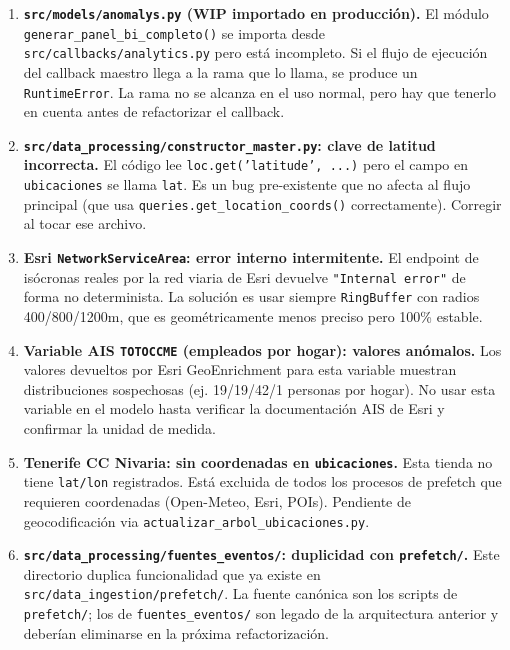 \documentclass[12pt, a4paper]{article}
\begin{document}
\begin{enumerate}
  \item \textbf{\texttt{src/models/anomalys.py} (WIP importado en producción).} El módulo \texttt{generar\_panel\_bi\_completo()} se importa desde \texttt{src/callbacks/analytics.py} pero está incompleto. Si el flujo de ejecución del callback maestro llega a la rama que lo llama, se produce un \texttt{RuntimeError}. La rama no se alcanza en el uso normal, pero hay que tenerlo en cuenta antes de refactorizar el callback.

  \item \textbf{\texttt{src/data\_processing/constructor\_master.py}: clave de latitud incorrecta.} El código lee \texttt{loc.get('latitude', ...)} pero el campo en \texttt{ubicaciones} se llama \texttt{lat}. Es un bug pre-existente que no afecta al flujo principal (que usa \texttt{queries.get\_location\_coords()} correctamente). Corregir al tocar ese archivo.

  \item \textbf{Esri \texttt{NetworkServiceArea}: error interno intermitente.} El endpoint de isócronas reales por la red viaria de Esri devuelve \texttt{"Internal error"} de forma no determinista. La solución es usar siempre \texttt{RingBuffer} con radios 400/800/1200m, que es geométricamente menos preciso pero 100\% estable.

  \item \textbf{Variable AIS \texttt{TOTOCCME} (empleados por hogar): valores anómalos.} Los valores devueltos por Esri GeoEnrichment para esta variable muestran distribuciones sospechosas (ej. 19/19/42/1 personas por hogar). No usar esta variable en el modelo hasta verificar la documentación AIS de Esri y confirmar la unidad de medida.

  \item \textbf{Tenerife CC Nivaria: sin coordenadas en \texttt{ubicaciones}.} Esta tienda no tiene \texttt{lat/lon} registrados. Está excluida de todos los procesos de prefetch que requieren coordenadas (Open-Meteo, Esri, POIs). Pendiente de geocodificación via \texttt{actualizar\_arbol\_ubicaciones.py}.

  \item \textbf{\texttt{src/data\_processing/fuentes\_eventos/}: duplicidad con \texttt{prefetch/}.} Este directorio duplica funcionalidad que ya existe en \texttt{src/data\_ingestion/prefetch/}. La fuente canónica son los scripts de \texttt{prefetch/}; los de \texttt{fuentes\_eventos/} son legado de la arquitectura anterior y deberían eliminarse en la próxima refactorización.
\end{enumerate}
\end{document}
